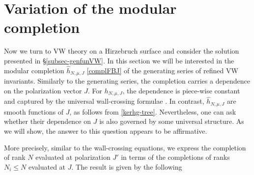 \documentclass[12pt,letterpaper]{JHEP3}
\def\whh{\widehat h}
\begin{document}
\section{Variation of the modular completion}
\label{sec-varcompl}

Now we turn to VW theory on a Hirzebruch surface and consider the solution presented in \S\ref{subsec-genfunVW}.
In this section we will be interested in the modular completion $\whh_{N,\mu,J}$ \eqref{complFBJ} of the generating series of refined VW invariants.
Similarly to the generating series, the completion carries a dependence on the polarization vector $J$.
For $h_{N,\mu,J}$, the dependence is piece-wise constant and captured by the universal wall-crossing formulae  
\cite{ks,Joyce:2008pc}. In contrast, $\whh_{N,\mu,J}$ are smooth functions of $J$, as follows from \eqref{kerhg-tree}.
Nevertheless, one can ask whether their dependence on $J$ is also governed by some universal structure.
As we will show, the answer to this question appears to be affirmative.

More precisely, similar to the wall-crossing equations, we express the completion of rank $N$ evaluated at polarization $J'$ in terms of
the completions of ranks $N_i\leq N$ evaluated at $J$.
The result is given by the following
\end{document}
